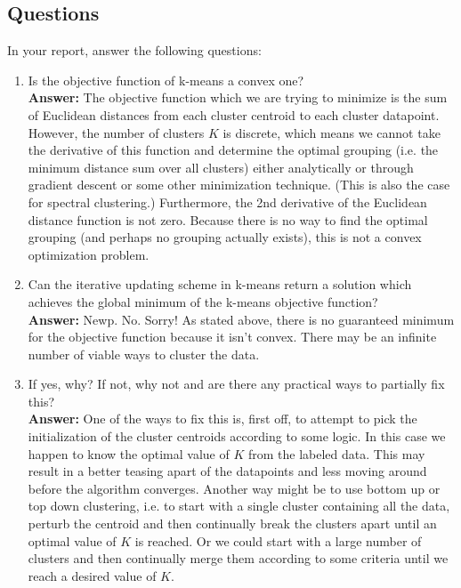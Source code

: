 \documentclass[11pt]{article}
\begin{document}
\subsection*{Questions}
In your report, answer the following questions: 
\begin{enumerate}
\item Is the objective function of k-means a convex one?
\\[5pt] {\bf Answer:} The objective function which we are trying to minimize is the sum of Euclidean distances from each cluster centroid to each cluster datapoint. However, the number of clusters $K$ is discrete, which means we cannot take the derivative of this function and determine the optimal grouping (i.e. the minimum distance sum over all clusters) either analytically or through gradient descent or some other minimization technique. (This is also the case for spectral clustering.) Furthermore, the 2nd derivative of the Euclidean distance function is not zero. Because there is no way to find the optimal grouping (and perhaps no grouping actually exists), this is not a convex optimization problem. 

\item Can the iterative updating scheme in k-means return a solution which achieves the global minimum of the k-means objective function?
\\[5pt] {\bf Answer:} Newp. No. Sorry! As stated above, there is no guaranteed minimum for the objective function because it isn't convex. There may be an infinite number of viable ways to cluster the data. 
\item If yes, why? If not, why not and are there any practical ways to partially fix this?
\\[5pt] {\bf Answer:} One of the ways to fix this is, first off, to attempt to pick the initialization of the cluster centroids according to some logic. In this case we happen to know the optimal value of $K$ from the labeled data. This may result in a better teasing apart of the datapoints and less moving around before the algorithm converges. Another way might be to use bottom up or top down clustering, i.e. to start with a single cluster containing all the data, perturb the centroid and then continually break the clusters apart until an optimal value of $K$ is reached. Or we could start with a large number of clusters and then continually merge them according to some criteria until we reach a desired value of $K$. 
\end{enumerate}
\end{document}
